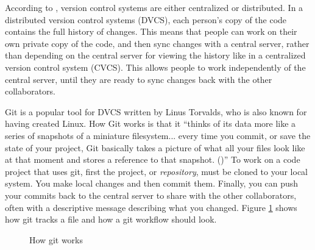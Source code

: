 \documentclass[report.tex]{subfiles}
\begin{document}
According to \textcite{gitbook}, version control systems are either centralized or distributed. In a distributed version control systems (DVCS), each person's copy of the code contains the full history of changes. This means that people can work on their own private copy of the code, and then sync changes with a central server, rather than depending on the central server for viewing the history like in a centralized version control system (CVCS). This allows people to work independently of the central server, until they are ready to sync changes back with the other collaborators.

Git is a popular tool for DVCS written by Linus Torvalds, who is also known for having created Linux. How Git works is that it ``thinks of its data more like a series of snapshots of a miniature filesystem... every time you commit, or save the state of your project, Git basically takes a picture of what all your files look like at that moment and stores a reference to that snapshot. (\cite{gitbook})''  To work on a code project that uses git, first the project, or \textit{repository}, must be cloned to your local system. You make local changes and then commit them. Finally, you can push your commits back to the central server to share with the other collaborators, often with a descriptive message describing what you changed. Figure \ref{fig:git} shows how git tracks a file and how a git workflow should look.

\begin{figure}[ht]
	\centering
	\hspace{0.1em}
	\caption{How git works}
	\label{fig:git}
\end{figure}
\end{document}
